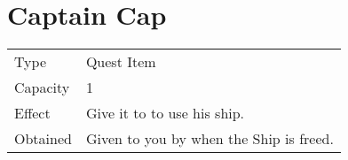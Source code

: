 \section{Captain Cap}
\label{item:captain_cap}


\noindent\begin{tabularx}{\textwidth}[l]{lX}
	Type
	& Quest Item
\\ %
	Capacity
	& 1
\\ %
	Effect
	& Give it to \nameref{char:mac} to use his ship.
\\ %
	Obtained
	& Given to you by \nameref{char:kaeli} when the Ship is freed.
\end{tabularx}
